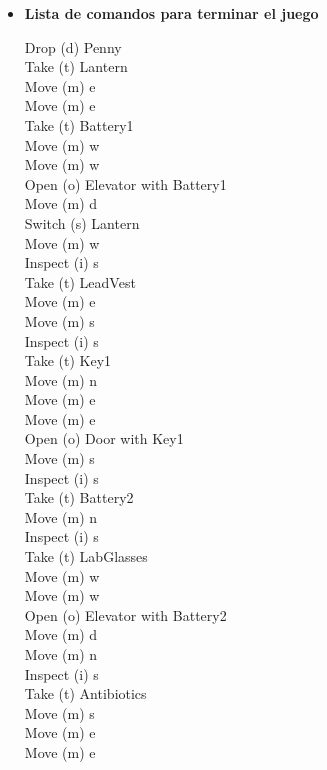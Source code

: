 \documentclass[10.9pt,a4paper]{article}
\newcounter{ex}
\begin{document}
\begin{itemize}
        \small
  \item \textbf{Lista de comandos para terminar el juego}
        \begin{multicols}{3}
          Drop (d) Penny
          \\ Take (t) Lantern
          \\ Move (m) e
          \\Move (m) e
          \\Take (t) Battery1
          \\Move (m) w
          \\Move (m) w
          \\Open (o) Elevator with Battery1
          \\Move (m) d
          \\Switch (s) Lantern
          \\Move (m) w
          \\Inspect (i) s
          \\Take (t) LeadVest
          \\Move (m) e
          \\Move (m) s
          \\Inspect (i) s
          \\Take (t) Key1
          \\Move (m) n
          \\Move (m) e
          \\Move (m) e
          \\Open (o) Door with Key1
          \\Move (m) s
          \\Inspect (i) s
          \\Take (t) Battery2
          \\Move (m) n
          \\Inspect (i) s
          \\Take (t) LabGlasses
          \\Move (m) w
          \\Move (m) w
          \\Open (o) Elevator with Battery2
          \\Move (m) d
          \\Move (m) n
          \\Inspect (i) s
          \\Take (t) Antibiotics
          \\Move (m) s
          \\Move (m) e
          \\Move (m) e

\end{multicols}
\end{itemize}
\end{document}
